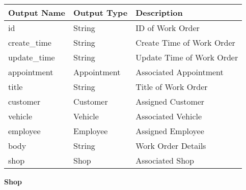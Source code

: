 \documentclass[12pt, titlepage]{article}
\begin{document}
\begin{table}[H]
	\begin{tabular}{|l|l|l|}
		\hline
		\textbf{Output Name} & \textbf{Output Type} & \textbf{Description}      \\
		\hline
		id                   & String               & ID of Work Order          \\
		\hline
		create\_time         & String               & Create Time of Work Order \\
		\hline
		update\_time         & String               & Update Time of Work Order \\
		\hline
		appointment          & Appointment          & Associated Appointment    \\
		\hline
		title                & String               & Title of Work Order       \\
		\hline
		customer             & Customer             & Assigned Customer         \\
		\hline
		vehicle              & Vehicle              & Associated Vehicle        \\
		\hline
		employee             & Employee             & Assigned Employee         \\
		\hline
		body                 & String               & Work Order Details        \\
		\hline
		shop                 & Shop                 & Associated Shop           \\
		\hline
	\end{tabular}
\end{table}

\textbf{Shop}
\end{document}
